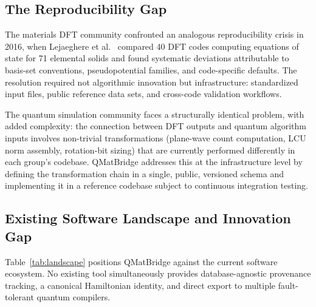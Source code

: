 \documentclass[11pt]{article}
\begin{document}
\subsection{The Reproducibility Gap}

The materials DFT community confronted an analogous reproducibility crisis
in 2016, when Lejaeghere et al.~\cite{Lejaeghere2016} compared 40 DFT codes
computing equations of state for 71 elemental solids and found systematic
deviations attributable to basis-set conventions, pseudopotential families,
and code-specific defaults.
The resolution required not algorithmic innovation but infrastructure:
standardized input files, public reference data sets, and cross-code
validation workflows.

The quantum simulation community faces a structurally identical problem,
with added complexity: the connection between DFT outputs and quantum
algorithm inputs involves non-trivial transformations (plane-wave count
computation, LCU norm assembly, rotation-bit sizing) that are currently
performed differently in each group's codebase.
QMatBridge addresses this at the infrastructure level by defining the
transformation chain in a single, public, versioned schema and implementing
it in a reference codebase subject to continuous integration testing.

\subsection{Existing Software Landscape and Innovation Gap}

Table~\ref{tab:landscape} positions QMatBridge against the current
software ecosystem.
No existing tool simultaneously provides database-agnostic provenance
tracking, a canonical Hamiltonian identity, and direct export to
multiple fault-tolerant quantum compilers.
\end{document}
